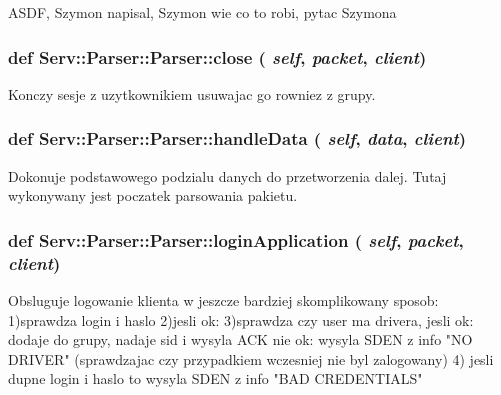 \label{class_serv_1_1_parser_1_1_parser_aa6c504eb2ef2712d8f05cec0e94f3eba}
\begin{DoxyVerb}ASDF, Szymon napisal, Szymon wie co to robi, pytac Szymona\end{DoxyVerb}
 \hypertarget{class_serv_1_1_parser_1_1_parser_ab6aa6195abf7a68df644640a8e4fd263}{
\subsubsection[{close}]{\setlength{\rightskip}{0pt plus 5cm}def Serv::Parser::Parser::close ( {\em self}, \/   {\em packet}, \/   {\em client})}}
\label{class_serv_1_1_parser_1_1_parser_ab6aa6195abf7a68df644640a8e4fd263}
\begin{DoxyVerb}Konczy sesje z uzytkownikiem usuwajac go rowniez z grupy.\end{DoxyVerb}
 \hypertarget{class_serv_1_1_parser_1_1_parser_a060ed5ba3cbf55b63ecc3f3aa006da04}{
\subsubsection[{handleData}]{\setlength{\rightskip}{0pt plus 5cm}def Serv::Parser::Parser::handleData ( {\em self}, \/   {\em data}, \/   {\em client})}}
\label{class_serv_1_1_parser_1_1_parser_a060ed5ba3cbf55b63ecc3f3aa006da04}
\begin{DoxyVerb}Dokonuje podstawowego podzialu danych do przetworzenia dalej. Tutaj wykonywany jest poczatek parsowania pakietu.\end{DoxyVerb}
 \hypertarget{class_serv_1_1_parser_1_1_parser_aec3286787a7c8642127416c77e1c2c8f}{
\subsubsection[{loginApplication}]{\setlength{\rightskip}{0pt plus 5cm}def Serv::Parser::Parser::loginApplication ( {\em self}, \/   {\em packet}, \/   {\em client})}}
\label{class_serv_1_1_parser_1_1_parser_aec3286787a7c8642127416c77e1c2c8f}
\begin{DoxyVerb}Obsluguje logowanie klienta w jeszcze bardziej skomplikowany sposob:
1)sprawdza login i haslo
2)jesli ok:
3)sprawdza czy user ma drivera, jesli ok:
    dodaje do grupy, nadaje sid i wysyla ACK
  nie ok:
    wysyla SDEN z info "NO DRIVER" (sprawdzajac czy przypadkiem wczesniej nie byl zalogowany)
4) jesli dupne login i haslo to wysyla SDEN z info "BAD CREDENTIALS"        
\end{DoxyVerb}
